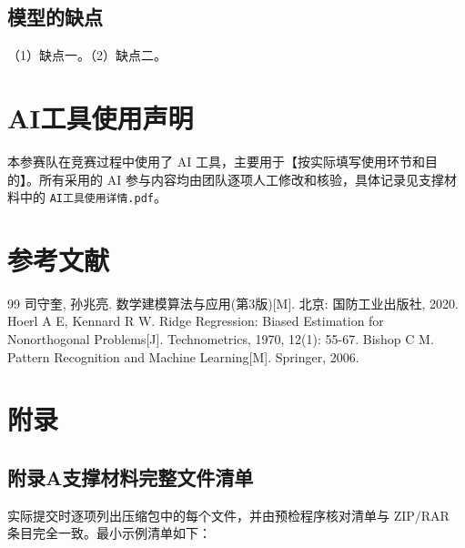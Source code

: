 \documentclass[12pt,a4paper]{article}
\renewcommand{\refname}{参考文献}
\begin{document}
\subsection{模型的缺点}

（1）缺点一。（2）缺点二。

\section{AI工具使用声明}

本参赛队在竞赛过程中使用了 AI 工具，主要用于【按实际填写使用环节和目的】。所有采用的 AI 参与内容均由团队逐项人工修改和核验，具体记录见支撑材料中的 \texttt{AI工具使用详情.pdf}。

\clearpage
\section{参考文献}

\renewcommand{\refname}{}

\begin{thebibliography}{99}
\setlength{\itemsep}{2pt}
\setlength{\topsep}{0pt}
\setlength{\labelsep}{0.5em}
 司守奎, 孙兆亮. 数学建模算法与应用(第3版)[M]. 北京: 国防工业出版社, 2020.
 Hoerl A E, Kennard R W. Ridge Regression: Biased Estimation for Nonorthogonal Problems[J]. Technometrics, 1970, 12(1): 55-67.
 Bishop C M. Pattern Recognition and Machine Learning[M]. Springer, 2006.
\end{thebibliography}

\clearpage
\section{附录}

\subsection*{附录A\quad 支撑材料完整文件清单}

实际提交时逐项列出压缩包中的每个文件，并由预检程序核对清单与 ZIP/RAR 条目完全一致。最小示例清单如下：
\end{document}
